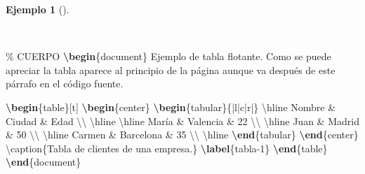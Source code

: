 \documentclass[
  a4paper,
]{scrreport}
\newenvironment{Shaded}{\begin{snugshade}}{\end{snugshade}}
\newcommand{\CommentTok}[1]{\textcolor[rgb]{0.37,0.37,0.37}{#1}}
\newcommand{\ExtensionTok}[1]{\textcolor[rgb]{0.00,0.23,0.31}{#1}}
\newcommand{\FunctionTok}[1]{\textcolor[rgb]{0.28,0.35,0.67}{#1}}
\newcommand{\KeywordTok}[1]{\textcolor[rgb]{0.00,0.23,0.31}{\textbf{#1}}}
\newcommand{\NormalTok}[1]{\textcolor[rgb]{0.00,0.23,0.31}{#1}}
\newcommand{\OperatorTok}[1]{\textcolor[rgb]{0.37,0.37,0.37}{#1}}
\theoremstyle{definition}
\newtheorem{example}{Ejemplo}[chapter]
\theoremstyle{remark}
\begin{document}
\begin{example}[]\protect\hypertarget{exm-tablas-flotantes}{}\label{exm-tablas-flotantes}

~

\begin{Shaded}
\begin{Highlighting}[]
\CommentTok{\% CUERPO}
\KeywordTok{\textbackslash{}begin}\NormalTok{\{}\ExtensionTok{document}\NormalTok{\}}
\NormalTok{Ejemplo de tabla flotante. Como se puede apreciar la tabla aparece al }
\NormalTok{principio de la página aunque va después de este párrafo en el código }
\NormalTok{fuente.}

\KeywordTok{\textbackslash{}begin}\NormalTok{\{}\ExtensionTok{table}\NormalTok{\}[t]}
\KeywordTok{\textbackslash{}begin}\NormalTok{\{}\ExtensionTok{center}\NormalTok{\}}
\KeywordTok{\textbackslash{}begin}\NormalTok{\{}\ExtensionTok{tabular}\NormalTok{\}\{|l|c|r|\}}
\FunctionTok{\textbackslash{}hline}
\NormalTok{Nombre }\OperatorTok{\&}\NormalTok{ Ciudad }\OperatorTok{\&}\NormalTok{ Edad }\FunctionTok{\textbackslash{}\textbackslash{}} 
\FunctionTok{\textbackslash{}hline}
\FunctionTok{\textbackslash{}hline}
\NormalTok{María }\OperatorTok{\&}\NormalTok{ Valencia }\OperatorTok{\&}\NormalTok{ 22 }\FunctionTok{\textbackslash{}\textbackslash{}}
\FunctionTok{\textbackslash{}hline}
\NormalTok{Juan }\OperatorTok{\&}\NormalTok{ Madrid }\OperatorTok{\&}\NormalTok{ 50 }\FunctionTok{\textbackslash{}\textbackslash{}}
\FunctionTok{\textbackslash{}hline}
\NormalTok{Carmen }\OperatorTok{\&}\NormalTok{ Barcelona }\OperatorTok{\&}\NormalTok{ 35 }\FunctionTok{\textbackslash{}\textbackslash{}}
\FunctionTok{\textbackslash{}hline}
\KeywordTok{\textbackslash{}end}\NormalTok{\{}\ExtensionTok{tabular}\NormalTok{\}}
\KeywordTok{\textbackslash{}end}\NormalTok{\{}\ExtensionTok{center}\NormalTok{\}}
\FunctionTok{\textbackslash{}caption}\NormalTok{\{Tabla de clientes de una empresa.\}}
\KeywordTok{\textbackslash{}label}\NormalTok{\{}\ExtensionTok{tabla{-}1}\NormalTok{\}}
\KeywordTok{\textbackslash{}end}\NormalTok{\{}\ExtensionTok{table}\NormalTok{\}}
\KeywordTok{\textbackslash{}end}\NormalTok{\{}\ExtensionTok{document}\NormalTok{\}}
\end{Highlighting}
\end{Shaded}

\begin{tcolorbox}[enhanced jigsaw, colframe=quarto-callout-note-color-frame, opacityback=0, title={Salida}, bottomrule=.15mm, left=2mm, coltitle=black, arc=.35mm, leftrule=.75mm, colback=white, rightrule=.15mm, colbacktitle=quarto-callout-note-color!10!white, toprule=.15mm, breakable, opacitybacktitle=0.6, bottomtitle=1mm, toptitle=1mm, titlerule=0mm]


\end{tcolorbox}
\end{example}
\end{document}

